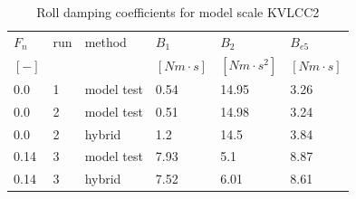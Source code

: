 \begin{table}[H]
\scriptsize
\center
\caption{Roll damping coefficients for model scale KVLCC2}
\label{tab:results}
\begin{tabular}{|l|l|l|l|l|l|}
\hline\addlinespace
$F_n$ & run & method & $B_1$ & $B_2$ & $B_{e5}$\\
$[-]$ &  &  & $[Nm \cdot s]$ & $[Nm \cdot s^2]$ & $[Nm \cdot s]$\\
\hline0.0 & 1 & model test & 0.54 & 14.95 & 3.26\\
0.0 & 2 & model test & 0.51 & 14.98 & 3.24\\
0.0 & 2 & hybrid & 1.2 & 14.5 & 3.84\\
0.14 & 3 & model test & 7.93 & 5.1 & 8.87\\
0.14 & 3 & hybrid & 7.52 & 6.01 & 8.61\\
\hline
\end{tabular}
\end{table}
